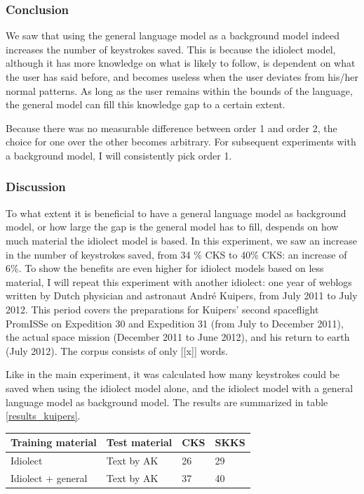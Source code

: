 \documentclass[12pt]{article}
\let\originaltable\table
\let\endoriginaltable\endtable
\renewenvironment{table}[1][ht]{%
  \originaltable[#1]
  \centering}%
  {\endoriginaltable}
\begin{document}
\subsubsection{Conclusion}
We saw that using the general language model as a background model indeed increases the number of keystrokes saved. This is because the idiolect model, although it has more knowledge on what is likely to follow, is dependent on what the user has said before, and becomes useless when the user deviates from his/her normal patterns. As long as the user remains within the bounds of the language, the general model can fill this knowledge gap to a certain extent.

Because there was no measurable difference between order 1 and order 2, the choice for one over the other becomes arbitrary. For subsequent experiments with a background model, I will consistently pick order 1.

\subsubsection{Discussion} \label{simple_exp_disc} %
To what extent it is beneficial to have a general language model as background model, or how large the gap is the general model has to fill, despends on how much material the idiolect model is based. In this experiment, we saw an increase in the number of keystrokes saved, from 34 \% CKS to 40\% CKS: an increase of 6\%. To show the benefits are even higher for idiolect models based on less material, I will repeat this experiment with another idiolect: one year of weblogs written by Dutch physician and astronaut Andr\'e Kuipers, from July 2011 to July 2012. This period covers the preparations for Kuipers' second spaceflight PromISSe on Expedition 30 and Expedition 31 (from July to December 2011), the actual space mission (December 2011 to June 2012), and his return to earth (July 2012). The corpus consists of only [[x]] words. 

Like in the main experiment, it was calculated how many keystrokes could be saved when using the idiolect model alone, and the idiolect model with a general language model as background model. The results are summarized in table \ref{results_kuipers}. 

\begin{table}[H]
\begin{tabular}{ll|ll} 
Training material&Test material&CKS&SKKS\\
\hline
Idiolect&Text by AK&26&29\\
Idiolect + general&Text by AK&37&40\\
\end{tabular} 
\caption{Percentage of keystrokes that can be saved when using the idiolect of Andr\'e Kuipers, with and without background model} \label{results_kuipers}
\end{table}
\end{document}
